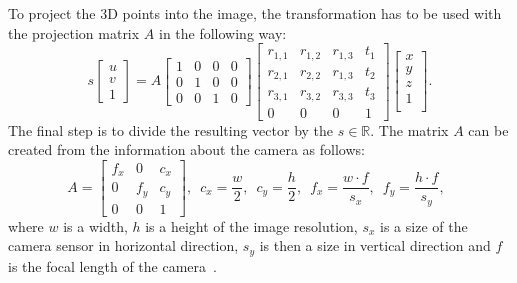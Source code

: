 \documentclass[thesis=B,english]{FITthesis}[2019/12/23]
\begin{document}
        To project the 3D points into the image, the transformation has to be used with the projection matrix \(A\) in the following way:
        \begin{equation}
            s
            \begin{bmatrix}
                u \\
                v \\
                1
            \end{bmatrix}
            =
            A
            \begin{bmatrix}
                1 & 0 & 0 & 0\\
                0 & 1 & 0 & 0\\
                0 & 0 & 1 & 0
            \end{bmatrix}
            \begin{bmatrix}
                r_{1, 1} & r_{1, 2} & r_{1, 3} & t_1\\
                r_{2, 1} & r_{2, 2} & r_{1, 3} & t_2\\
                r_{3, 1} & r_{3, 2} & r_{3, 3} & t_3\\
                0 & 0 & 0 & 1           
            \end{bmatrix}
            \begin{bmatrix}
                x\\
                y\\
                z\\
                1\\
            \end{bmatrix}.
        \end{equation}
        The final step is to divide the resulting vector by the \(s \in \mathbb{R}\). The matrix \(A\) can be created from the information about the camera as follows:
                \begin{equation}
                   A =  \begin{bmatrix}
                            f_x & 0 & c_x\\
                            0 &   f_y & c_y \\
                            0 &  0    & 1
                        \end{bmatrix}, \enspace
                        c_x = \frac{w}{2}, \enspace
                        c_y = \frac{h}{2}, \enspace
                        f_x = \frac{w \cdot f}{s_x}, \enspace
                        f_y = \frac{h \cdot f}{s_y}, \enspace
                \end{equation}
                where \(w\) is a width, \(h\) is a height of the image resolution, \(s_x\) is a size of the camera sensor in horizontal direction, \(s_y\) is then a size in vertical direction and \(f\) is the focal length of the camera~\cite{Riba2021}.
            
\end{document}
